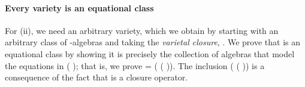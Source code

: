 \paragraph*{Every variety is an equational class}
For (ii), we need an arbitrary variety, which we obtain by starting with an arbitrary class
 of -algebras and taking the \emph{varietal closure},  .
We prove that   is an equational class by showing it is precisely the collection of
algebras that model the equations in  ( ); that is, we prove
  =  ( ( )).
The inclusion     ( ( )) is a
consequence of the fact that   is a closure operator.

\begin{code}%
\>[0]\<%
\\
\>[0]\AgdaSpace{}%
\AgdaModule{\AgdaUnderscore{}}\AgdaSpace{}%
\AgdaSymbol{(}\AgdaSpace{}%
\AgdaSymbol{:}\AgdaSpace{}%
\AgdaSymbol{(}\AgdaSpace{}%
\AgdaSpace{}%
\AgdaSymbol{)}\AgdaSpace{}%
\AgdaSymbol{(}\AgdaSpace{}%
\AgdaSpace{}%
\AgdaSpace{}%
\AgdaSpace{}%
\AgdaSpace{}%
\AgdaSymbol{))\{}\AgdaSpace{}%
\AgdaSymbol{:}\AgdaSpace{}%
\AgdaSpace{}%
\AgdaSymbol{(}\AgdaSpace{}%
\AgdaSpace{}%
\AgdaSpace{}%
\AgdaSpace{}%
\AgdaSymbol{)\}}\AgdaSpace{}%
\<%
\\
\>[0][@{}l@{\AgdaIndent{0}}]%
\>[1]\AgdaSpace{}%
\AgdaSpace{}%
\AgdaSymbol{=}\AgdaSpace{}%
\AgdaSpace{}%
\AgdaSpace{}%
\AgdaSpace{}%
\AgdaSpace{}%
\AgdaSpace{}%
\AgdaSymbol{;}\AgdaSpace{}%
\AgdaSpace{}%
\AgdaSymbol{=}\AgdaSpace{}%
\AgdaSpace{}%
\<%
\\
%
\\[\AgdaEmptyExtraSkip]%
%
\>[1]\AgdaSpace{}%
\AgdaSymbol{:}\AgdaSpace{}%
\AgdaSymbol{\{}\AgdaSpace{}%
\AgdaSymbol{=}\AgdaSpace{}%
\AgdaSymbol{\}\{}\AgdaSymbol{\}\{}\AgdaSymbol{\}\{}\AgdaSymbol{\}\{}\AgdaSymbol{\}\{}\AgdaSymbol{\}}\AgdaSpace{}%

\end{code}
